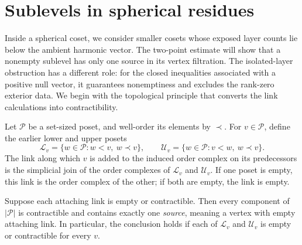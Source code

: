 \section{Sublevels in spherical residues}
\label{sec:residues}

Inside a spherical coset, we consider smaller cosets whose exposed layer
counts lie below the ambient harmonic vector.  The two-point estimate will
show that a nonempty sublevel has only one source in its vertex filtration.
The isolated-layer obstruction has a different role: for the closed
inequalities associated with a positive null vector, it guarantees
nonemptiness and excludes the rank-zero exterior data.  We begin with the
topological principle that converts the link calculations into
contractibility.

\begin{lemma}
\label{lem:filtration-principle}
Let $\mathcal P$ be a set-sized poset, and well-order its elements by
$\prec$.  For $v\in\mathcal P$, define the earlier lower and upper posets
\[
 \mathcal L_v=\{w\in\mathcal P:w<v,\ w\prec v\},\qquad
 \mathcal U_v=\{w\in\mathcal P:v<w,\ w\prec v\}.
\]
The link along which $v$ is added to the induced order complex on its
predecessors is the simplicial join of the order complexes of
$\mathcal L_v$ and $\mathcal U_v$.  If one poset is empty, this link is
the order complex of the other; if both are empty, the link is empty.

Suppose each attaching link is empty or contractible.  Then every
component of $|\mathcal P|$ is contractible and contains exactly one
\emph{source}, meaning a vertex with empty attaching link.  In
particular, the conclusion holds if each of $\mathcal L_v$ and
$\mathcal U_v$ is empty or contractible for every $v$.
\end{lemma}

